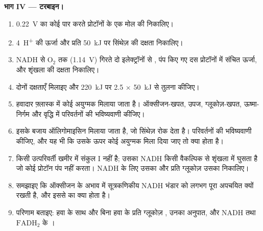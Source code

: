 \begin{problem}
\medskip
\noindent\textbf{भाग IV --- टरबाइन।}
\begin{enumerate}[resume]
  \item \qty{0.22}{V} का कोई  पार करते प्रोटॉनों के एक
        मोल की  निकालिए।
  \item \qty{4}{H^+} की ऊर्जा और प्रति  \qty{50}{kJ} पर सिंथेज़ की
        दक्षता निकालिए।
  \item NADH से $\mathrm{O_2}$ तक (\qty{1.14}{V}) गिरते दो
        इलेक्ट्रॉनों से , पंप किए गए दस प्रोटॉनों में संचित
        ऊर्जा, और शृंखला की दक्षता निकालिए।
  \item दोनों दक्षताएँ मिलाइए और \qty{220}{kJ} पर 2.5  $\times$
        \qty{50}{kJ} से तुलना कीजिए।
  \item हवादार फ़्लास्क में कोई अयुग्मक मिलाया जाता है।
        ऑक्सीजन-खपत,  उपज, ग्लूकोज़-खपत, ऊष्मा-निर्गम और वृद्धि में
        परिवर्तनों की भविष्यवाणी कीजिए।
  \item इसके बजाय ऑलिगोमाइसिन मिलाया जाता है, जो सिंथेज़ रोक देता है।
        परिवर्तनों की भविष्यवाणी कीजिए, और यह भी कि उसके ऊपर कोई
        अयुग्मक मिला दिया जाए तो क्या होता है।
  \item किसी उत्परिवर्ती खमीर में संकुल I नहीं है; उसका NADH किसी
        वैकल्पिक  से शृंखला में घुसता है जो कोई प्रोटॉन पंप नहीं
        करता। NADH के लिए उसका  और प्रति ग्लूकोज़ उसका 
        निकालिए।
  \item समझाइए कि ऑक्सीजन के अभाव में  सूत्रकणिकीय NADH भंडार को
        लगभग पूरा अपचयित क्यों रखती है, और इससे  का क्या
        होता है।
  \item परिणाम बताइए: हवा के साथ और बिना हवा के प्रति ग्लूकोज़ ,
        उनका अनुपात, और NADH तथा $\mathrm{FADH_2}$ के ।
\end{enumerate}
\end{problem}
